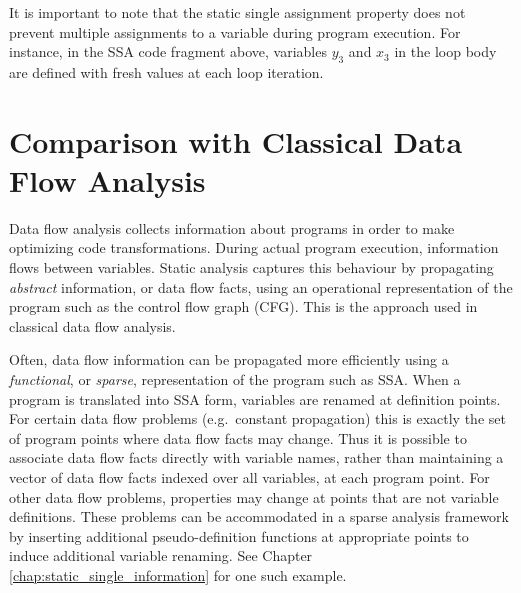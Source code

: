 It is important to note that the static single assignment 
property does not prevent multiple assignments to a variable
during program execution. For instance, in the SSA code fragment above,
variables $y_3$ and $x_3$ in the loop body are defined with fresh values 
at each loop iteration.





\section{Comparison with Classical Data Flow Analysis}
\label{sec:vanilla:dfa}


Data flow analysis collects information about programs
in order to make optimizing code transformations.
During actual program execution, information flows between
variables. Static analysis captures
this behaviour by propagating \textit{abstract} information,
or data flow facts,
using an operational representation of the 
program such as the control flow graph (CFG).
This is the approach used in 
classical data flow analysis.

Often, data flow information can be propagated more efficiently
using a \textit{functional}, or \textit{sparse},
representation of the program such 
as SSA.
When a program is translated into SSA form,
variables are renamed at definition points.
For certain data flow problems (e.g.\ constant propagation)
this is exactly the set of program points where data flow
facts may change.
Thus it is possible to associate data flow facts directly with 
variable names, rather than
maintaining a vector of data flow facts indexed over all variables,
at each program point.
For other data flow problems, properties may 
change at points that are not variable definitions.
These problems can be accommodated in a sparse analysis framework
by inserting additional pseudo-definition functions at appropriate 
points
to induce additional variable renaming. 
See Chapter \ref{chap:static_single_information}
for one such example.

